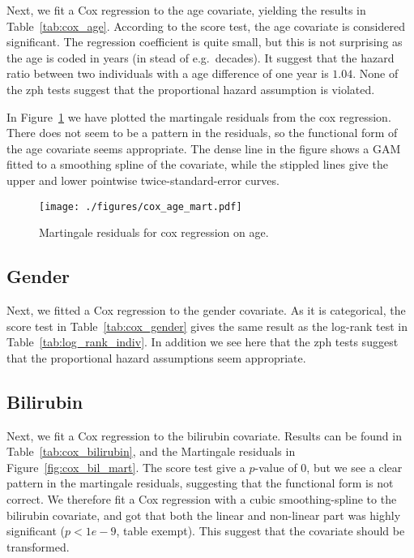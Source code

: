 \documentclass[11pt,a4paper]{article}
\begin{document}
Next, we fit a Cox regression to the age covariate, yielding the results in Table~\ref{tab:cox_age}. According to the score test, the age covariate is considered significant.  The regression coefficient is quite small, but this is not surprising as the age is coded in years (in stead of e.g.\ decades). It suggest that the hazard ratio between two individuals with a age difference of one year is $1.04$.
None of the zph tests suggest that the proportional hazard assumption is violated.



In Figure~\ref{fig:cox_age_mart} we have plotted the martingale residuals from the cox regression. There does not seem to be a pattern in the residuals, so the functional form of the age covariate seems appropriate. The dense line in the figure shows a GAM fitted to a smoothing spline of the covariate, while the stippled lines give the upper and lower pointwise twice-standard-error curves.

\begin{figure}[h!tb]
    \begin{center}
        \texttt{[image: ./figures/cox\_age\_mart.pdf]}
    \end{center}
    \vspace{-0.2cm}
    \caption{Martingale residuals for cox regression on age.}
    \label{fig:cox_age_mart}
\end{figure}

\subsection{Gender}

Next, we fitted a Cox regression to the gender covariate. As it is categorical, the score test in Table~\ref{tab:cox_gender} gives the same result as the log-rank test in Table~\ref{tab:log_rank_indiv}. In addition we see here that the zph tests suggest that the proportional hazard assumptions seem appropriate.




\subsection{Bilirubin}

Next, we fit a Cox regression to the bilirubin covariate. Results can be found in Table~\ref{tab:cox_bilirubin}, and the Martingale residuals in Figure~\ref{fig:cox_bil_mart}. The score test give a $p$-value of 0, but we see a clear pattern in the martingale residuals, suggesting that the functional form is not correct. We therefore fit a Cox regression with a cubic smoothing-spline to the bilirubin covariate, and got that both the linear and non-linear part was highly significant ($p < 1e-9$, table exempt). This suggest that the covariate should be transformed.
\end{document}

